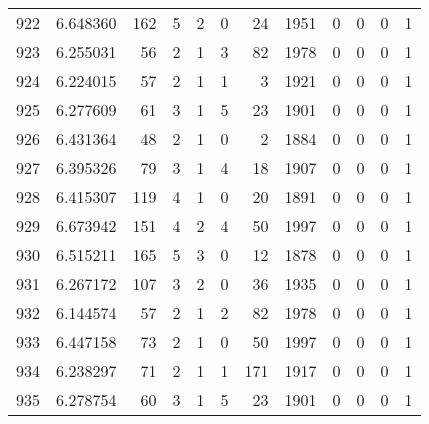 \begin{tabular}{lrrrrrrrrrrr}
922 &  6.648360 &  162 &      5 &        2 &      0 &              24 &  1951 &               0 &               0 &               0 &               1 \\
923 &  6.255031 &   56 &      2 &        1 &      3 &              82 &  1978 &               0 &               0 &               0 &               1 \\
924 &  6.224015 &   57 &      2 &        1 &      1 &               3 &  1921 &               0 &               0 &               0 &               1 \\
925 &  6.277609 &   61 &      3 &        1 &      5 &              23 &  1901 &               0 &               0 &               0 &               1 \\
926 &  6.431364 &   48 &      2 &        1 &      0 &               2 &  1884 &               0 &               0 &               0 &               1 \\
927 &  6.395326 &   79 &      3 &        1 &      4 &              18 &  1907 &               0 &               0 &               0 &               1 \\
928 &  6.415307 &  119 &      4 &        1 &      0 &              20 &  1891 &               0 &               0 &               0 &               1 \\
929 &  6.673942 &  151 &      4 &        2 &      4 &              50 &  1997 &               0 &               0 &               0 &               1 \\
930 &  6.515211 &  165 &      5 &        3 &      0 &              12 &  1878 &               0 &               0 &               0 &               1 \\
931 &  6.267172 &  107 &      3 &        2 &      0 &              36 &  1935 &               0 &               0 &               0 &               1 \\
932 &  6.144574 &   57 &      2 &        1 &      2 &              82 &  1978 &               0 &               0 &               0 &               1 \\
933 &  6.447158 &   73 &      2 &        1 &      0 &              50 &  1997 &               0 &               0 &               0 &               1 \\
934 &  6.238297 &   71 &      2 &        1 &      1 &             171 &  1917 &               0 &               0 &               0 &               1 \\
935 &  6.278754 &   60 &      3 &        1 &      5 &              23 &  1901 &               0 &               0 &               0 &               1 \\

\end{tabular}
